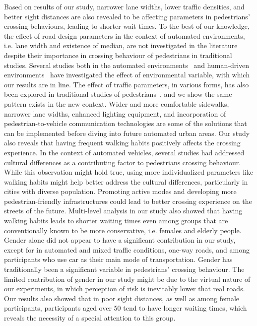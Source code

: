 Based on results of our study, narrower lane widths, lower traffic densities, and better sight distances are also revealed to be affecting parameters in pedestrians' crossing behaviours, leading to shorter wait times. To the best of our knowledge, the effect of road design parameters in the context of automated environments, i.e. lane width and existence of median, are not investigated in the literature despite their importance in crossing behaviour of pedestrians in traditional studies. Several studies both in the automated environments~\citep{rasouli2019autonomous} and human-driven environments~\citep{sun2015estimation} have investigated the effect of environmental variable, with which our results are in line. The effect of traffic parameters, in various forms, has also been explored in traditional studies of pedestrians~\citep{schmidt2009pedestrians,ishaque2008behavioural}, and we show the same pattern exists in the new context. Wider and more comfortable sidewalks, narrower lane widths, enhanced lighting equipment, and incorporation of pedestrian-to-vehicle communication technologies are some of the solutions that can be implemented before diving into future automated urban areas. Our study also reveals that having frequent walking habits positively affects the crossing experience. In the context of automated vehicles, several studies had addressed cultural differences as a contributing factor to pedestrians crossing behaviour. While this observation might hold true, using more individualized parameters like walking habits might help better address the cultural differences, particularly in cities with diverse population. Promoting active modes and developing more pedestrian-friendly infrastructures could lead to better crossing experience on the streets of the future. Multi-level analysis in our study also showed that having walking habits leads to shorter waiting times even among groups that are conventionally known to be more conservative, i.e. females and elderly people. Gender alone did not appear to have a significant contribution in our study, except for in automated and mixed traffic conditions, one-way roads, and among participants who use car as their main mode of transportation. Gender has traditionally been a significant variable in pedestrians' crossing behaviour. The limited contribution of gender in our study might be due to the virtual nature of our experiments, in which perception of risk is inevitably lower that real roads. Our results also showed that in poor sight distances, as well as among female participants, participants aged over 50 tend to have longer waiting times, which reveals the necessity of a special attention to this group.